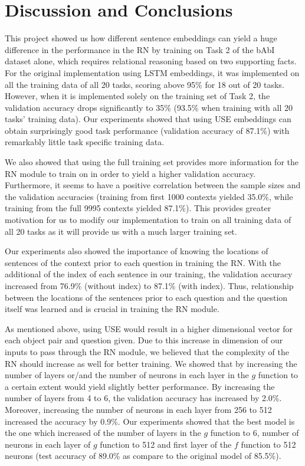 \documentclass{article}
\begin{document}
\section{Discussion and Conclusions}

This project showed us how different sentence embeddings can yield a huge difference in the performance in the RN by training on Task 2 of the bAbI dataset alone, which requires relational reasoning based on two supporting facts. For the original implementation using LSTM embeddings, it was implemented on all the training data of all 20 tasks, scoring above 95\% for 18 out of 20 tasks. However, when it is implemented solely on the training set of Task 2, the validation accuracy drops significantly to 35\% (93.5\% when training with all 20 tasks' training data). Our experiments showed that using USE embeddings can obtain surprisingly good task performance (validation accuracy of 87.1\%) with remarkably little task specific training data.

We also showed that using the full training set provides more information for the RN module to train on in order to yield a higher validation accuracy. Furthermore, it seems to have a positive correlation between the sample sizes and the validation accuracies (training from first 1000 contexts yielded 35.0\%, while training from the full 9995 contexts yielded 87.1\%). This provides greater motivation for us to modify our implementation to train on all training data of all 20 tasks as it will provide us with a much larger training set.

Our experiments also showed the importance of knowing the locations of sentences of the context prior to each question in training the RN. With the additional of the index of each sentence in our training, the validation accuracy increased from 76.9\% (without index) to 87.1\% (with index). Thus, relationship between the locations of the sentences prior to each question and the question itself was learned and is crucial in training the RN module.

As mentioned above, using USE would result in a higher dimensional vector for each object pair and question given. Due to this increase in dimension of our inputs to pass through the RN module, we believed that the complexity of the RN should increase as well for better training. We showed that by increasing the number of layers or/and the number of neurons in each layer in the $g$ function to a certain extent would yield slightly better performance. By increasing the number of layers from 4 to 6,  the validation accuracy has increased by 2.0\%. Moreover, increasing the number of neurons in each layer from 256 to 512 increased the accuracy by 0.9\%. Our experiments showed that the best model is the one which increased of the number of layers in the $g$ function to 6, number of neurons in each layer of $g$ function to 512 and first layer of the $f$ function to 512 neurons (test accuracy of 89.0\% as compare to the original model of 85.5\%).
\end{document}
